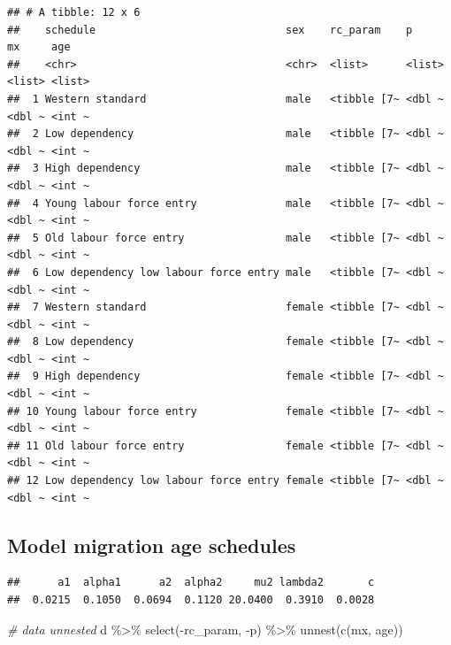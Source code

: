 \documentclass[
]{book}
\newenvironment{Shaded}{\begin{snugshade}}{\end{snugshade}}
\newcommand{\CommentTok}[1]{\textcolor[rgb]{0.56,0.35,0.01}{\textit{#1}}}
\newcommand{\DecValTok}[1]{\textcolor[rgb]{0.00,0.00,0.81}{#1}}
\newcommand{\FunctionTok}[1]{\textcolor[rgb]{0.00,0.00,0.00}{#1}}
\newcommand{\NormalTok}[1]{#1}
\newcommand{\SpecialCharTok}[1]{\textcolor[rgb]{0.00,0.00,0.00}{#1}}
\begin{document}
\begin{verbatim}
## # A tibble: 12 x 6
##    schedule                              sex    rc_param    p      mx     age   
##    <chr>                                 <chr>  <list>      <list> <list> <list>
##  1 Western standard                      male   <tibble [7~ <dbl ~ <dbl ~ <int ~
##  2 Low dependency                        male   <tibble [7~ <dbl ~ <dbl ~ <int ~
##  3 High dependency                       male   <tibble [7~ <dbl ~ <dbl ~ <int ~
##  4 Young labour force entry              male   <tibble [7~ <dbl ~ <dbl ~ <int ~
##  5 Old labour force entry                male   <tibble [7~ <dbl ~ <dbl ~ <int ~
##  6 Low dependency low labour force entry male   <tibble [7~ <dbl ~ <dbl ~ <int ~
##  7 Western standard                      female <tibble [7~ <dbl ~ <dbl ~ <int ~
##  8 Low dependency                        female <tibble [7~ <dbl ~ <dbl ~ <int ~
##  9 High dependency                       female <tibble [7~ <dbl ~ <dbl ~ <int ~
## 10 Young labour force entry              female <tibble [7~ <dbl ~ <dbl ~ <int ~
## 11 Old labour force entry                female <tibble [7~ <dbl ~ <dbl ~ <int ~
## 12 Low dependency low labour force entry female <tibble [7~ <dbl ~ <dbl ~ <int ~
\end{verbatim}

\hypertarget{model-migration-age-schedules-6}{%
\subsection{Model migration age schedules}\label{model-migration-age-schedules-6}}

\begin{Shaded}
\end{Shaded}

\begin{verbatim}
##      a1  alpha1      a2  alpha2     mu2 lambda2       c 
##  0.0215  0.1050  0.0694  0.1120 20.0400  0.3910  0.0028
\end{verbatim}

\begin{Shaded}
\begin{Highlighting}[]
\CommentTok{\# data unnested}
\NormalTok{d }\SpecialCharTok{\%\textgreater{}\%}
  \FunctionTok{select}\NormalTok{(}\SpecialCharTok{{-}}\NormalTok{rc\_param, }\SpecialCharTok{{-}}\NormalTok{p) }\SpecialCharTok{\%\textgreater{}\%}
  \FunctionTok{unnest}\NormalTok{(}\FunctionTok{c}\NormalTok{(mx, age))}
\end{Highlighting}
\end{Shaded}
\end{document}
